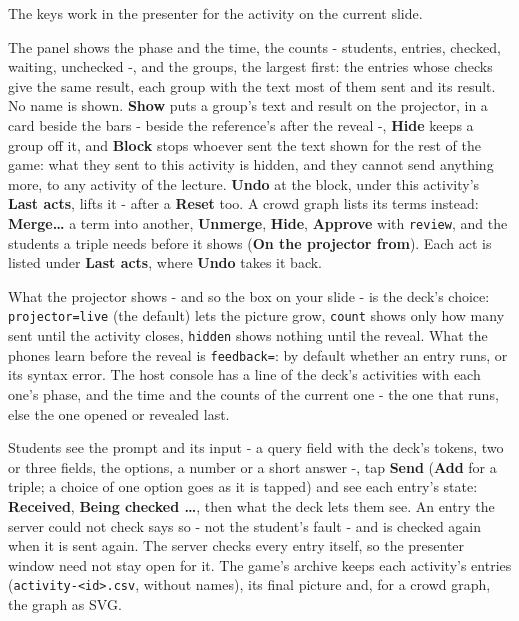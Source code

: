 \documentclass[a4paper,11pt]{article}
\begin{document}
The keys work in the presenter for the activity on the current slide.\par

The panel shows the phase and the time, the counts -\allowbreak{} students, entries, checked, waiting, unchecked -\allowbreak{}, and the groups, the largest first: the entries whose checks give the same result, each group with the text most of them sent and its result.\allowbreak{} No name is shown.\allowbreak{} \textbf{Show} puts a group's text and result on the projector, in a card beside the bars -\allowbreak{} beside the reference's after the reveal -\allowbreak{}, \textbf{Hide} keeps a group off it, and \textbf{Block} stops whoever sent the text shown for the rest of the game: what they sent to this activity is hidden, and they cannot send anything more, to any activity of the lecture.\allowbreak{} \textbf{Undo} at the block, under this activity's \textbf{Last acts}, lifts it -\allowbreak{} after a \textbf{Reset} too.\allowbreak{} A crowd graph lists its terms instead: \textbf{Merge…} a term into another, \textbf{Unmerge}, \textbf{Hide}, \textbf{Approve} with \texttt{review}, and the students a triple needs before it shows (\textbf{On the projector from}).\allowbreak{} Each act is listed under \textbf{Last acts}, where \textbf{Undo} takes it back.\par

What the projector shows -\allowbreak{} and so the box on your slide -\allowbreak{} is the deck's choice: \texttt{projector=\allowbreak{}live} (the default) lets the picture grow, \texttt{count} shows only how many sent until the activity closes, \texttt{hidden} shows nothing until the reveal.\allowbreak{} What the phones learn before the reveal is \texttt{feedback=}: by default whether an entry runs, or its syntax error.\allowbreak{} The host console has a line of the deck's activities with each one's phase, and the time and the counts of the current one -\allowbreak{} the one that runs, else the one opened or revealed last.\par

Students see the prompt and its input -\allowbreak{} a query field with the deck's tokens, two or three fields, the options, a number or a short answer -\allowbreak{}, tap \textbf{Send} (\textbf{Add} for a triple; a choice of one option goes as it is tapped) and see each entry's state: \textbf{Received}, \textbf{Being checked …}, then what the deck lets them see.\allowbreak{} An entry the server could not check says so -\allowbreak{} not the student's fault -\allowbreak{} and is checked again when it is sent again.\allowbreak{} The server checks every entry itself, so the presenter window need not stay open for it.\allowbreak{} The game's archive keeps each activity's entries (\texttt{activity-\allowbreak{}<id>.\allowbreak{}csv}, without names), its final picture and, for a crowd graph, the graph as SVG.\par
\end{document}
